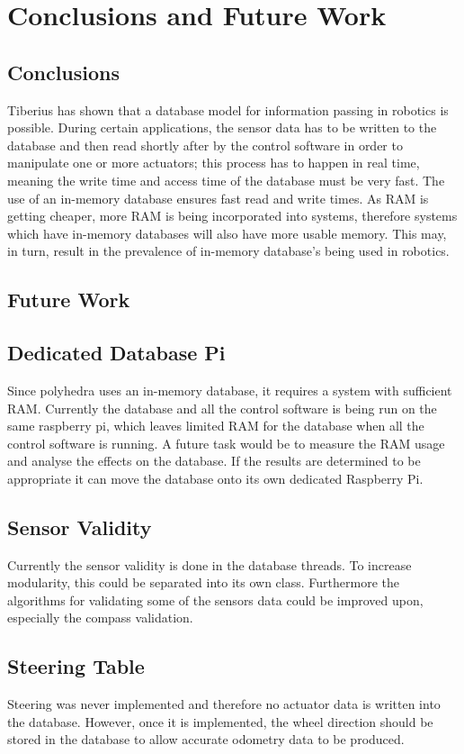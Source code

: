 \section{Conclusions and Future Work}
\subsection{Conclusions}
Tiberius has shown that a database model for information passing in robotics is possible. During certain applications, the sensor data has to be written to the database and then read shortly after by the control software in order to manipulate one or more actuators; this process has to happen in real time, meaning the write time and access time of the database must be very fast. The use of an in-memory database ensures fast read and write times. As RAM is getting cheaper, more RAM is being incorporated into systems, therefore systems which have in-memory databases will also have more usable memory. This may, in turn, result in the prevalence of in-memory database's being used in robotics.

\subsection{Future Work}
\subsection{Dedicated Database Pi}
Since polyhedra uses an in-memory database, it requires a system with sufficient RAM. Currently the database and all the control software is being run on the same raspberry pi, which leaves limited RAM for the database when all the control software is running. A future task would be to measure the RAM usage and analyse the effects on the database. If the results are determined to be appropriate it can move the database onto its own dedicated Raspberry Pi.

\subsection{Sensor Validity}
Currently the sensor validity is done in the database threads. To increase modularity, this could be separated into its own class. 
Furthermore the algorithms for validating some of the sensors data could be improved upon, especially the compass validation.

\subsection{Steering Table}
Steering was never implemented and therefore no actuator data is written into the database. However, once it is implemented, the wheel direction should be stored in the database to allow 
accurate odometry data to be produced.  

